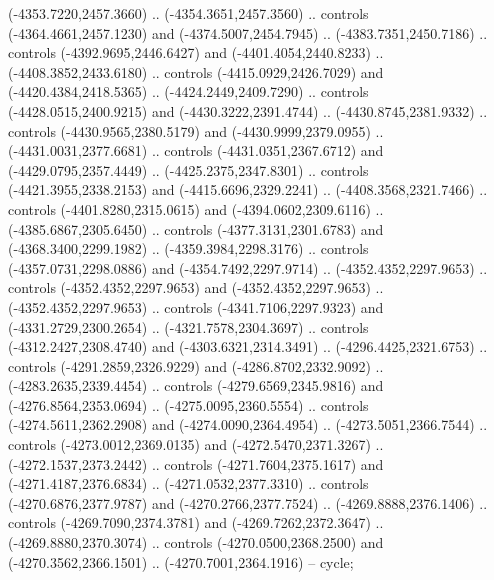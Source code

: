 \begin{scope}[shift={(430.80877,-416.69739)}]
\begin{scope}[shift={(4537.8125,-1856.4436)}]
\begin{scope}[shift={(-148.39113,-28.14259)}]
        (-4353.7220,2457.3660) .. (-4354.3651,2457.3560) .. controls
        (-4364.4661,2457.1230) and (-4374.5007,2454.7945) .. (-4383.7351,2450.7186) ..
        controls (-4392.9695,2446.6427) and (-4401.4054,2440.8233) ..
        (-4408.3852,2433.6180) .. controls (-4415.0929,2426.7029) and
        (-4420.4384,2418.5365) .. (-4424.2449,2409.7290) .. controls
        (-4428.0515,2400.9215) and (-4430.3222,2391.4744) .. (-4430.8745,2381.9332) ..
        controls (-4430.9565,2380.5179) and (-4430.9999,2379.0955) ..
        (-4431.0031,2377.6681) .. controls (-4431.0351,2367.6712) and
        (-4429.0795,2357.4449) .. (-4425.2375,2347.8301) .. controls
        (-4421.3955,2338.2153) and (-4415.6696,2329.2241) .. (-4408.3568,2321.7466) ..
        controls (-4401.8280,2315.0615) and (-4394.0602,2309.6116) ..
        (-4385.6867,2305.6450) .. controls (-4377.3131,2301.6783) and
        (-4368.3400,2299.1982) .. (-4359.3984,2298.3176) .. controls
        (-4357.0731,2298.0886) and (-4354.7492,2297.9714) .. (-4352.4352,2297.9653) ..
        controls (-4352.4352,2297.9653) and (-4352.4352,2297.9653) ..
        (-4352.4352,2297.9653) .. controls (-4341.7106,2297.9323) and
        (-4331.2729,2300.2654) .. (-4321.7578,2304.3697) .. controls
        (-4312.2427,2308.4740) and (-4303.6321,2314.3491) .. (-4296.4425,2321.6753) ..
        controls (-4291.2859,2326.9229) and (-4286.8702,2332.9092) ..
        (-4283.2635,2339.4454) .. controls (-4279.6569,2345.9816) and
        (-4276.8564,2353.0694) .. (-4275.0095,2360.5554) .. controls
        (-4274.5611,2362.2908) and (-4274.0090,2364.4954) .. (-4273.5051,2366.7544) ..
        controls (-4273.0012,2369.0135) and (-4272.5470,2371.3267) ..
        (-4272.1537,2373.2442) .. controls (-4271.7604,2375.1617) and
        (-4271.4187,2376.6834) .. (-4271.0532,2377.3310) .. controls
        (-4270.6876,2377.9787) and (-4270.2766,2377.7524) .. (-4269.8888,2376.1406) ..
        controls (-4269.7090,2374.3781) and (-4269.7262,2372.3647) ..
        (-4269.8880,2370.3074) .. controls (-4270.0500,2368.2500) and
        (-4270.3562,2366.1501) .. (-4270.7001,2364.1916) -- cycle;


\end{scope}
\end{scope}
\end{scope}
